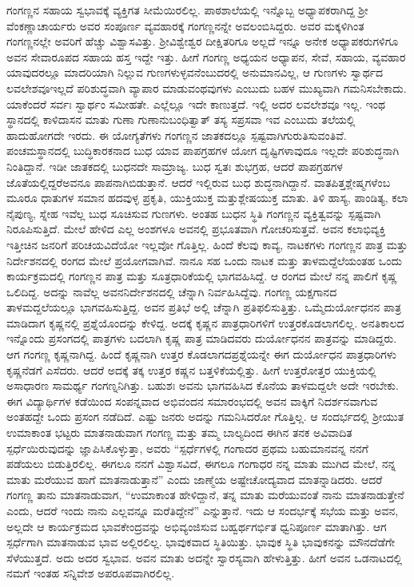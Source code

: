 {ಗಂಗಣ್ಣನ ಸಹಾಯ ಸ್ವಭಾವಕ್ಕೆ ವ್ಯಕ್ತಿಗತ ಸೀಮೆಯಿರಲಿಲ್ಲ. ಪಾಠಶಾಲೆಯಲ್ಲಿ ಇನ್ನೊಬ್ಬ ಅಧ್ಯಾಪಕರಾಗಿದ್ದ ಶ್ರೀ ವೆಂಕಣ್ಣಾಚಾರ್ಯರು ಅವರ ಸಂಪೂರ್ಣ ವ್ಯವಹಾ\-ರಕ್ಕೆ ಗಂಗಣ್ಣನನ್ನೇ ಅವಲಂಬಿಸಿದ್ದರು. ಅವರ ಮಕ್ಕಳಿಗಿಂತ ಗಂಗಣ್ಣನಲ್ಲೇ ಅವರಿಗೆ ಹೆಚ್ಚು ವಿಶ್ವಾಸವಿತ್ತು. ಶ್ರೀವಿಶ್ವೇಶ್ವರ ದೀಕ್ಷಿತರಿಗೂ ಅಲ್ಲದೆ ಇನ್ನೂ ಅನೇಕ ಅಧ್ಯಾಪಕರು\-ಗಳಿಗೂ ಅವನ ಸೇವಾರೂಪದ ಸಹಾಯ ಹಸ್ತ ಇದ್ದೇ ಇತ್ತು.  ಹೀಗೆ ಗಂಗಣ್ಣ ಅಧ್ಯಯನ ಅಧ್ಯಾಪನ, ಸೇವೆ, ಸಹಾಯ, ವ್ಯವಹಾರ ಯಾವುದರಲ್ಲೂ ಮಾದರಿಯಾಗಿ ನಿಲ್ಲುವ ಗುಣಗ\-ಳುಳ್ಳವನೆಂಬುದರಲ್ಲಿ ಅನುಮಾನವಿಲ್ಲ, ಆ ಗುಣಗಳು ಸ್ವಾರ್ಥದ ಲವಲೇಶವೂ\break ಇಲ್ಲದೆ ಪರಿಶುದ್ಧವಾಗಿ ವ್ಯಾಪಾರ ಮಾಡುವಂಥವುಗಳು ಎಂಬುದು ಬಹಳ ಮುಖ್ಯವಾಗಿ ಗಮನಿಸಬೇಕಾದು. ಯಾಕೆಂದರೆ ಸರ್ವಃ ಸ್ವಾರ್ಥಂ ಸಮೀಹತೇ. ಎಲ್ಲೆಲ್ಲೂ ಇದೇ ಕಾಣುತ್ತದೆ. ಇಲ್ಲಿ ಅದರ ಲವಲೇಶವೂ ಇಲ್ಲ.  ಇಂಥ ಸ್ಥಾನದಲ್ಲಿ ಕಾಳಿದಾಸನ ಮಾತು \enginline{-} ಗುಣಾ ಗುಣಾನುಬಂಧಿತ್ವಾತ್ ತಸ್ಯ ಸಪ್ರಸವಾ ಇವ ಎಂಬುದು ತಲೆಯಲ್ಲಿ ಹಾದು\break ಹೋಗದೇ ಇರದು. ಈ ಯೋಗ್ಯತೆಗಳು ಗಂಗಣ್ಣನ ಜಾತಕದಲ್ಲೂ ಸ್ಪಷ್ಟವಾಗಿ\break ಗುರುತಿಸುವಂತಿವೆ. ಪಂಚಮಸ್ಥಾನದಲ್ಲಿ ಬುದ್ಧಿಕಾರಕನಾದ ಬುಧ ಯಾವ ಪಾಪಗ್ರಹಗಳ ಯೋಗ ದೃಷ್ಟಿಗಳಾವುದೂ ಇಲ್ಲದೇ ಪರಿಶುದ್ಧನಾಗಿ ನಿಂತಿದ್ದಾನೆ. ಇಡೀ ಜಾತಕದಲ್ಲಿ \hbox{ಬುಧನದೇ} ಸಾಮ್ರಾಜ್ಯ. ಬುಧ ಸ್ವತಃ ಶುಭಗ್ರಹ, ಆದರೆ ಪಾಪಗ್ರಹಗಳ ಜೊತೆಯಲ್ಲಿದ್ದರೆ\break ಅವನೂ ಪಾಪನಾಗಿಬಿಡುತ್ತಾನೆ. ಆದರೆ ಇಲ್ಲಿರುವ ಬುಧ ಶುದ್ಧನಾಗಿದ್ದಾನೆ. ವಾತಪಿತ್ತ\-ಶ್ಲೇಷ್ಮಗಳೆಂಬ ಮೂರೂ ಧಾತುಗಳ ಸಮಾನ ಹದವುಳ್ಳ ಪ್ರಕೃತಿ, ಯುಕ್ತಿಯುಕ್ತ ಮತ್ತು\break ಶ್ಲೇಷಯುಕ್ತ ಮಾತು. ತಿಳಿ ಹಾಸ್ಯ, ಪಾಂಡಿತ್ಯ, ಕಲಾ ನೈಪುಣ್ಯ, ಸ್ನೇಹ ಇವೆಲ್ಲ ಬುಧ ಸೂಚಿ\-ಸುವ ಗುಣಗಳು. ಅಂತಹ ಬುಧನ ಸ್ಥಿತಿ ಗಂಗಣ್ಣನ ವ್ಯಕ್ತಿತ್ವವನ್ನು ಸ್ಪಷ್ಟವಾಗಿ ನಿರೂಪಿ\-ಸುತ್ತಿದೆ. ಮೇಲೆ ಹೇಳಿದ ಎಲ್ಲ ಅಂಶಗಳೂ ಅವನಲ್ಲಿ ಪ್ರಭೂತವಾಗಿ \hbox{ಗೋಚರಿಸುತ್ತವೆ}. ಅವನ ಕಲಾಭಿವ್ಯಕ್ತಿ ಇತ್ತೀಚಿನ ಜನರಿಗೆ ಪರಿಚಯವಿದೆಯೋ ಇಲ್ಲವೋ ಗೊತ್ತಿಲ್ಲ. ಹಿಂದೆ ಕೆಲವು ಕಾವ್ಯ, ನಾಟಕಗಳು ಗಂಗಣ್ಣನ ಪಾತ್ರ ಮತ್ತು ನಿರ್ದೇಶನದಲ್ಲಿ ರಂಗದ ಮೇಲೆ ಪ್ರಯೋಗವಾಗಿವೆ. ನಾನೂ ಸಹ ಒಂದು ನಾಟಕ ಮತ್ತು ತಾಳಮದ್ದೆಲೆ\-ಯಂತಹ ಒಂದು ಕಾರ್ಯಕ್ರಮದಲ್ಲಿ ಗಂಗಣ್ಣನ ಪಾತ್ರ ಮತ್ತು ಸೂತ್ರಧಾರಿಕೆಯಲ್ಲಿ ಭಾಗವಹಿಸಿದ್ದೆ. ಆ ರಂಗದ ಮೇಲೆ ನನ್ನ ಪಾಲಿಗೆ ಕೃಷ್ಣ ಒಲಿದಿದ್ದ. ಅದನ್ನು ನಾವೆಲ್ಲ ಅವನ\break ನಿರ್ದೇಶನದಲ್ಲಿ ಚೆನ್ನಾಗಿ ನಿರ್ವಹಿಸಿದ್ದೆವು. ಗಂಗಣ್ಣ ಯಕ್ಷಗಾನದ ತಾಳಮದ್ದಲೆಯಲ್ಲೂ ಭಾಗವಹಿಸುತ್ತಿದ್ದ. ಅವನ ಪ್ರತಿಭೆ ಅಲ್ಲಿ ಚೆನ್ನಾಗಿ ಪ್ರತಿಫಲಿಸುತ್ತಿತ್ತು. ಒಮ್ಮೆ\break ದುರ್ಯೋಧನನ ಪಾತ್ರ ಮಾಡಿದಾಗ ಕೃಷ್ಣನಲ್ಲಿ ಪ್ರಶ್ನೆಯೊಂದನ್ನು ಕೇಳಿದ್ದ. ಅದಕ್ಕೆ ಕೃಷ್ಣನ ಪಾತ್ರಧಾರಿಗಳಿಗೆ ಉತ್ತರಕೊಡಲಾಗಲಿಲ್ಲ. ಅನತಿಕಾಲದ ಇನ್ನೊಂದು ಪ್ರಸಂಗ\-ದಲ್ಲಿ ಪಾತ್ರಗಳು ಬದಲಾಗಿ ಕೃಷ್ಣ ಪಾತ್ರ ಮಾಡಿದವರು ದುರ್ಯೋಧನನ ಪಾತ್ರವನ್ನು ಮಾಡಿದ್ದರು. ಆಗ ಗಂಗಣ್ಣ ಕೃಷ್ಣನಾಗಿದ್ದ. ಹಿಂದೆ ಕೃಷ್ಣನಾಗಿ ಉತ್ತರ ಕೊಡಲಾಗದ\break ಪ್ರಶ್ನೆಯನ್ನೇ ಈಗ ದುರ್ಯೋಧನ ಪಾತ್ರಧಾರಿಗಳು ಕೃಷ್ಣನೆಡಗೆ ಎಸೆದರು. ಆದರೆ ಅದಕ್ಕೆ ತಕ್ಕ ಉತ್ತರ ಕಷ್ಣನ ಬತ್ತಳಿಕೆಯಲ್ಲಿತ್ತು. ಹೀಗೆ ಉತ್ತರೋತ್ತರ ಯುಕ್ತಿಯಲ್ಲಿ ಅಸಾಧಾರಣ ಸಾಮರ್ಥ್ಯ ಗಂಗಣ್ನನಿಗಿತ್ತು. ಬಹುಶಃ ಅವನು ಭಾಗವಹಿಸಿದ ಕೊನೆಯ ತಾಳ\-ಮದ್ದಲೇ ಅದೇ ಇರಬೇಕು. ಈಗ ವಿದ್ಯಾರ್ಥಿಗಳ ಕಡೆಯಿಂದ ಸಂಪನ್ನವಾದ ಅಭಿವಂದನ ಸಮಾರಂಭದಲ್ಲಿ ಅವನ ವಾಕ್ಕಿಗೆ ನಿದರ್ಶನವಾಗುವ ಅಂತಹದ್ದೇ ಒಂದು ಪ್ರಸಂಗ ನಡೆದಿದೆ. ಎಷ್ಟು ಜನರು ಅದನ್ನು ಗಮನಿಸಿದರೋ ಗೊತ್ತಿಲ್ಲ. ಆ ಸಂದರ್ಭದಲ್ಲಿ  ಶ್ರೀಯುತ ಉಮಾಕಾಂತ ಭಟ್ಟರು ಮಾತನಾಡುವಾಗ ಗಂಗಣ್ಣ ಮತ್ತು ತಮ್ಮ ಬಾಲ್ಯದಿಂದ ಈಗಿನ ತನಕ ಅವಿವಾದಿತ ಸ್ಪರ್ಧೆಯಿರುವುದನ್ನು ಜ್ಞಾಪಿಸಿಕೊಳ್ಳುತ್ತಾ, ಅವರು “ಸ್ಪರ್ಧೆಗಳಲ್ಲಿ ಗಂಗಾದರ ಪ್ರಥಮ ಬಹುಮಾನವನ್ನ ನನಗೆ ಪಡೆಯಲು ಬಿಡುತ್ತಿರಲಿಲ್ಲ. \enginline{-} ಈಗಲೂ ನನಗೆ ವಿಶ್ವಾಸವಿದೆ, ಈಗಲೂ ಗಂಗಾಧರ ನನ್ನ ಮಾತು ಮುಗಿದ ಮೇಲೆ, ನನ್ನ ಮಾತು ಮರೆಯುವ ಹಾಗೆ ಮಾತನಾಡುತ್ತಾನೆ” ಎಂದು ಜಾಣ್ಮೆಯ ಅಷ್ಟೇ\break ಚೋದ್ಯವಾದ ಮಾತನ್ನಾಡಿದರು. ಆದರೆ ಗಂಗಣ್ಣ ತಾನು ಮಾತನಾಡುವಾಗ, “ಉಮಾಕಾಂತ ಹೇಳಿದ್ದಾನೆ, ತನ್ನ ಮಾತು ಮರೆಯುವಂತೆ ನಾನು ಮಾತನಾಡುತ್ತೇನೆ ಎಂದು, ಆದರೆ ಇಂದು ನಾನು ಎಲ್ಲವನ್ನೂ ಮರೆತಿದ್ದೇನೆ” ಎನ್ನುತ್ತಾನೆ. ಇದು ಆ ಸಂದರ್ಭಕ್ಕೆ ಸಭೆಯ ಮತ್ತು ಅವನ, ಅಲ್ಲದೇ ಆ ಕಾರ್ಯಕ್ರಮದ ಭಾವಕೇಂದ್ರವನ್ನು ಅಭಿವ್ಯಂಜಿಸುವ ಬಹ್ವರ್ಥಗರ್ಭಿತ ಧ್ವನಿಪೂರ್ಣ ಮಾತಾಗಿತ್ತು. ಆಗ ಸ್ಪರ್ಧೆಗಾಗಿ ಮಾತನಾಡುವ ಭಾವ ಅಲ್ಲಿರಲಿಲ್ಲ. ಭಾವುಕವಾದ ಸ್ಥಿತಿಯಿತ್ತು. ಭಾವುಕ ಸ್ಥಿತಿ ಭಾವುಕನನ್ನು ಮೌನ\-ದೆಡೆಗೇ ಸೆಳೆಯುತ್ತದೆ. ಅದು ಅದರ ಸ್ವಭಾವ. ಅವನ ಮಾತು ಅದನ್ನೇ ಸ್ವಾರಸ್ಯವಾಗಿ ಹೇಳುತ್ತಿತ್ತು. ಹೀಗೆ ಅವನ ಒಡನಾಟದಲ್ಲಿ ನಮಗೆ ಇಂತಹ ಸನ್ನಿವೇಶ ಅಪರೂಪವಾಗಿರಲಿಲ್ಲ. 

}
